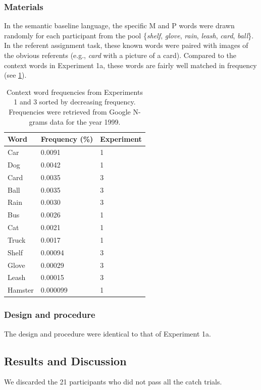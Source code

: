 \documentclass[man,floatsintext]{apa6}
\begin{document}
\subsubsection{Materials}
In the semantic baseline language, the specific M and P words were drawn randomly for each participant from the pool \{\emph{shelf}, \emph{glove}, \emph{rain}, \emph{leash}, \emph{card}, \emph{ball}\}. In the referent assignment task, these known words were paired with images of the obvious referents (e.g., \emph{card} with a picture of a card). Compared to the context words in Experiment 1a, these words are fairly well matched in frequency (see \ref{word-freqs}).

\begin{table}[t]
  \begin{center}
    \begin{tabular}{l l l}
      Word &  Frequency (\%) & Experiment\\
      \hline
      Car & 0.0091 & 1\\
      Dog & 0.0042 & 1\\
      Card & 0.0035 & 3\\
      Ball & 0.0035 & 3\\
      Rain & 0.0030 & 3\\
      Bus & 0.0026 & 1\\
      Cat & 0.0021 & 1\\
      Truck & 0.0017 & 1\\
      Shelf & 0.00094 & 3\\
      Glove & 0.00029 & 3\\
      Leash & 0.00015 & 3\\
      Hamster & 0.000099 & 1\\
      \hline
    \end{tabular}
  \end{center}
  \caption{Context word frequencies from Experiments 1 and 3 sorted by decreasing frequency. Frequencies were retrieved from Google N-grams data for the year 1999.}
  \label{word-freqs}

\end{table}

\subsubsection{Design and procedure}
The design and procedure were identical to that of Experiment 1a.

\subsection{Results and Discussion}
We discarded the 21 participants who did not pass all the catch trials.
\end{document}
